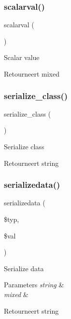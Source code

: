\subsubsection{\texorpdfstring{scalarval()}{scalarval()}}
{\footnotesize\ttfamily scalarval (\begin{DoxyParamCaption}{ }\end{DoxyParamCaption})}

Scalar value

\begin{DoxyReturn}{Retourneert}
mixed 
\end{DoxyReturn}
\mbox{\label{class_x_m_l___r_p_c___values_a59df3d3c8fbb47a946d6a29f0b3c8e0c}} 
\subsubsection{\texorpdfstring{serialize\_class()}{serialize\_class()}}
{\footnotesize\ttfamily serialize\+\_\+class (\begin{DoxyParamCaption}{ }\end{DoxyParamCaption})}

Serialize class

\begin{DoxyReturn}{Retourneert}
string 
\end{DoxyReturn}
\mbox{\label{class_x_m_l___r_p_c___values_a7058e00e310218c447d3c9fea0ee0a3d}} 
\subsubsection{\texorpdfstring{serializedata()}{serializedata()}}
{\footnotesize\ttfamily serializedata (\begin{DoxyParamCaption}\item[{}]{\$typ,  }\item[{}]{\$val }\end{DoxyParamCaption})}

Serialize data


\begin{DoxyParams}{Parameters}
{\em string} & \\
\hline
{\em mixed} & \\
\hline
\end{DoxyParams}
\begin{DoxyReturn}{Retourneert}
string 
\end{DoxyReturn}
\mbox{\label{class_x_m_l___r_p_c___values_a1a4bfc79985c185745d96ebe3a1e5c3d}} 
